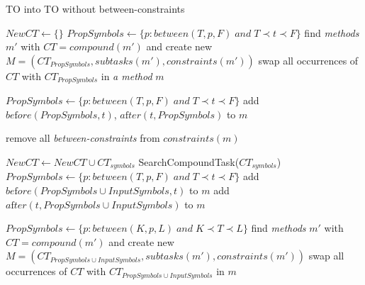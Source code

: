 \begin{algorithm}
    \caption{TO into TO without between-constraints}\label{alg04:1}
    \begin{algorithmic}[1]
            \State $NewCT \gets \{\}$ 
                    \State $PropSymbols \gets \{p: between(T, p, F) \; and \; T \prec t \prec F \}$
                        \State find \emph{methods} $m'$ with $CT = compound(m')$ and create new $M=(CT_{PropSymbols}, subtasks(m'), constraints(m'))$
                    \EndIf
                    \State swap all occurrences of $CT$ with $CT_{PropSymbols}$ in \emph{a method} $m$
                \EndFor

                    \State $PropSymbols \gets \{p: between(T, p, F) \; and \; T \prec t \prec F \}$
                    \State {}
                    \State add $be\text{f}ore(PropSymbols, t)$, $a\text{f}ter(t, PropSymbols)$ to $m$
                \EndFor
                
                \State remove all \emph{between-constraints} from $constraints(m)$

                    \State $NewCT \gets NewCT \cup CT_{symbols}$
                    \State SearchCompoundTask($CT_{symbols}$)
                \EndFor
            \EndWhile
        \EndProcedure
                    \State $PropSymbols \gets \{p: between(T, p, F) \; and \; T \prec t \prec F \}$
                    \State add $be\text{f}ore(PropSymbols \cup InputSymbols, t)$ to $m$
                    \State add $a\text{f}ter(t, PropSymbols \cup InputSymbols)$ to $m$
                \EndFor

                    \State $PropSymbols \gets \{p: between(K, p, L) \; and \; K \prec T \prec L \}$
                        \State find \emph{methods} $m'$ with $CT = compound(m')$ and create new $M=(CT_{PropSymbols \cup InputSymbols}, subtasks(m'), constraints(m'))$
                    \EndIf
                    \State swap all occurrences of $CT$ with $CT_{PropSymbols \cup InputSymbols}$ in $m$
                \EndFor


\end{algorithmic}
\end{algorithm}
